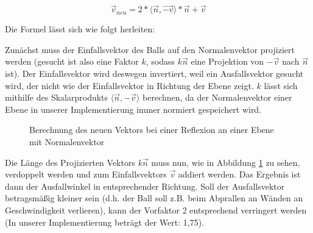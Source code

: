 \begin{equation}	
\label{reflexion}
	\vec{v}_{neu} = 2* \langle \vec{n},\vec{-v} \rangle * \vec{n} + \vec{v}
\end{equation}

Die Formel lässt sich wie folgt herleiten:

Zunächst muss der Einfallsvektor des Balls auf den Normalenvektor projiziert werden (gesucht ist also eine Faktor $k$, sodass $k\vec{n}$ eine Projektion von $-\vec{v}$ nach $\vec{n}$ ist). Der Einfallsvektor wird deswegen invertiert, weil ein Ausfallsvektor gesucht wird, der nicht wie der Einfallsvektor in Richtung der Ebene zeigt. $k$ lässt sich mithilfe des Skalarprodukts $\langle\vec{n},-\vec{v}\rangle$ berechnen, da der Normalenvektor einer Ebene in unserer Implementierung immer normiert gespeichert wird.



    \begin{figure}
	\begin{center}
    \hspace{1.5cm}%
    \caption{Berechnung des neuen Vektors bei einer Reflexion an einer Ebene mit Normalenvektor}
        \label{fig_reflexion}
	\end{center}
    \end{figure}
    
Die Länge des Projizierten Vektors $k\vec{n}$ muss nun, wie in Abbildung \ref{fig_reflexion} zu sehen, verdoppelt werden und zum Einfallsvektors $\vec{v}$ addiert werden. Das Ergebnis ist dann der Ausfallwinkel in entsprechender Richtung. Soll der Ausfallsvektor betragsmäßig kleiner sein (d.h. der Ball soll z.B. beim Abprallen an Wänden an Geschwindigkeit verlieren), kann der Vorfaktor 2 entsprechend verringert werden (In unserer Implementierung beträgt der Wert: 1,75).